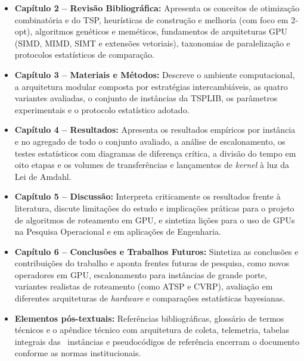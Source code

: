 \begin{itemize}
      \item
            \textbf{Capítulo 2 -- Revisão Bibliográfica:} Apresenta os conceitos de otimização combinatória e do TSP, heurísticas de construção e melhoria (com foco em \(2\)-opt), algoritmos genéticos e meméticos, fundamentos de arquiteturas GPU (SIMD, MIMD, SIMT e extensões vetoriais), taxonomias de paralelização e protocolos estatísticos de comparação.
      \item
            \textbf{Capítulo 3 -- Materiais e Métodos:} Descreve o ambiente computacional, a arquitetura modular composta por estratégias intercambiáveis, as quatro variantes avaliadas, o conjunto de instâncias da TSPLIB, os parâmetros experimentais e o protocolo estatístico adotado.
      \item
            \textbf{Capítulo 4 -- Resultados:} Apresenta os resultados empíricos por instância e no agregado de todo o conjunto avaliado, a análise de escalonamento, os testes estatísticos com diagramas de diferença crítica, a divisão do tempo em oito etapas e os volumes de transferências e lançamentos de \emph{kernel} à luz da Lei de Amdahl.
      \item
            \textbf{Capítulo 5 -- Discussão:} Interpreta criticamente os resultados frente à literatura, discute limitações do estudo e implicações práticas para o projeto de algoritmos de roteamento em GPU, e sintetiza lições para o uso de GPUs na Pesquisa Operacional e em aplicações de Engenharia.
      \item
            \textbf{Capítulo 6 -- Conclusões e Trabalhos Futuros:} Sintetiza as conclusões e contribuições do trabalho e aponta frentes futuras de pesquisa, como novos operadores em GPU, escalonamento para instâncias de grande porte, variantes realistas de roteamento (como ATSP e CVRP), avaliação em diferentes arquiteturas de \emph{hardware} e comparações estatísticas bayesianas.
      \item
            \textbf{Elementos pós-textuais:} Referências bibliográficas, glossário de termos técnicos e o apêndice técnico com arquitetura de coleta, telemetria, tabelas integrais das \totalinstancias\ instâncias e pseudocódigos de referência encerram o documento conforme as normas institucionais.
\end{itemize}
